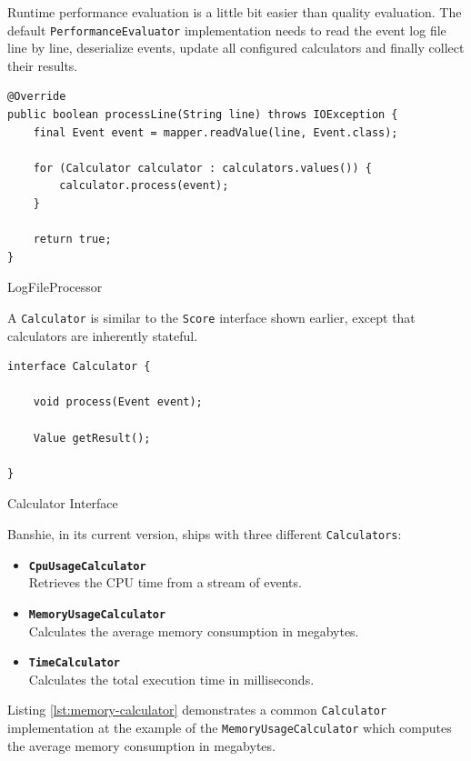 Runtime performance evaluation is a little bit easier than quality evaluation. The default \texttt{PerformanceEvaluator} implementation needs to read the event log file line by line, deserialize events, update all configured calculators and finally collect their results.

\begin{listing}[H]
\begin{verbatim}
@Override
public boolean processLine(String line) throws IOException {
    final Event event = mapper.readValue(line, Event.class);

    for (Calculator calculator : calculators.values()) {
        calculator.process(event);
    }

    return true;
}
\end{verbatim}
\caption{LogFileProcessor}
\end{listing}

A \texttt{Calculator} is similar to the \texttt{Score} interface shown earlier, except that calculators are inherently stateful.

\begin{listing}[H]
\begin{verbatim}
interface Calculator {

    void process(Event event);

    Value getResult();

}
\end{verbatim}
\caption{Calculator Interface}
\label{lst:calculator}
\end{listing}

Banshie, in its current version, ships with three different \texttt{Calculators}:

\begin{itemize}
	\item \textbf{\texttt{CpuUsageCalculator}} \\
		Retrieves the CPU time from a stream of events.
	\item \textbf{\texttt{MemoryUsageCalculator}} \\
		Calculates the average memory consumption in megabytes.
	\item \textbf{\texttt{TimeCalculator}} \\
		Calculates the total execution time in milliseconds.
\end{itemize}

\newpage
Listing \ref{lst:memory-calculator} demonstrates a common \texttt{Calculator} implementation at the example of the \texttt{MemoryUsageCalculator} which computes the average memory consumption in megabytes.

